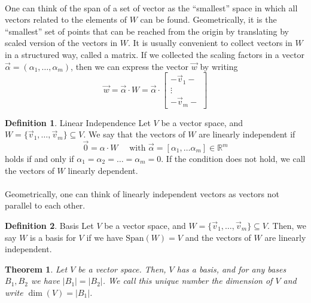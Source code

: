 \documentclass{article}
\newtheorem{theorem}{Theorem}[section]
\theoremstyle{definition}
\newtheorem{definition}{Definition}[section]
\theoremstyle{example}
\newcommand{\Reals}{\mathbb{R}}
\newcommand{\Span}{\text{Span}}
\begin{document}
\paragraph{} One can think of the span of a set of vector as the ``smallest''
space in which all vectors related to the elements of $W$ can be found.
Geometrically, it is the ``smallest'' set of points that can be reached from the
origin by translating by scaled version of the vectors in $W$. It is usually
convenient to collect vectors in $W$ in a structured way, called a matrix. If we
collected the scaling factors in a vector $\vec{\alpha} = (\alpha_1, \hdots,
\alpha_m)$, then we can express the vector $\vec{w}$ by writing
\[
  \vec{w} = \vec{\alpha} \cdot W = \vec{\alpha} \cdot 
  \begin{bmatrix}
    - \vec{v}_1 - \\
    \vdots \\
    - \vec{v}_m - 
  \end{bmatrix}
\]
\begin{definition}{Linear Independence}
  Let $V$ be a vector space, and $W = \{\vec{v}_1, \hdots, \vec{v}_m\} \subseteq
  V$. We say that the vectors of $W$ are linearly independent if
  \[
    \vec{0} = \alpha \cdot W\quad\text{ with }
    \vec{\alpha} = [\alpha_1, \hdots \alpha_m] \in \Reals^m 
 \]
  holds if and only if $\alpha_1 = \alpha_2 = \hdots = \alpha_m = 0$. If the
  condition does not hold, we call the vectors of $W$ linearly dependent.
\end{definition}
\paragraph{} Geometrically, one can think of linearly independent vectors as
vectors not parallel to each other.
\begin{definition}{Basis}
  Let $V$ be a vector space, and $W = \{\vec{v}_1, \hdots, \vec{v}_m\} \subseteq
  V$. Then, we say $W$ is a basis for $V$ if we have $\Span(W) = V$ and the
  vectors of $W$ are linearly independent.
\end{definition}
\begin{theorem}
  Let $V$ be a vector space. Then, $V$ has a basis, and for any bases $B_1, B_2$
  we have $|B_1| = |B_2|$. We call this unique number the dimension of $V$ and
  write $\dim(V) = |B_1|$.
\end{theorem}
\end{document}
